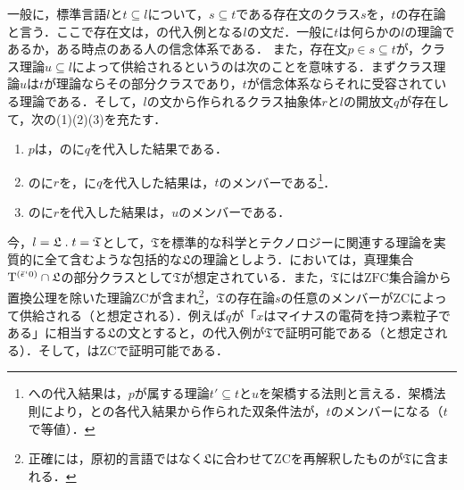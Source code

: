 一般に，標準言語$l$と$t\subseteq l$について，$s\subseteq t$である存在文のクラス$s$を，$t$の存在論と言う．ここで存在文は，の代入例となる$l$の文だ．一般に$t$は何らかの$l$の理論であるか，ある時点のある人の信念体系である．
また，存在文$p\in s\subseteq t$が，クラス理論$u\subseteq l$によって供給されるというのは次のことを意味する．まずクラス理論$u$は$t$が理論ならその部分クラスであり，$t$が信念体系ならそれに受容されている理論である．そして，$l$の文から作られるクラス抽象体$r$と$l$の開放文$q$が存在して，次の(1)(2)(3)を充たす．
\begin{enumerate}[label=(\arabic*)]
    \item $p$は，のに$q$を代入した結果である．
    \item {}の\kagi{$ \alpha $}に$r$を，に$q$を代入した結果は，$t$のメンバーである\footnote{
        への代入結果は，$p$が属する理論$t'\subseteq t$と$u$を架橋する法則と言える．架橋法則により，との各代入結果から作られた双条件法が，$t$のメンバーになる（$t$で等値）．
    }．
    \item {}の\kagi{$ \alpha $}に$r$を代入した結果は，$u$のメンバーである．
\end{enumerate}

今，$ l = \mathfrak{L}\con{1}t = \mathfrak{T} $として，$\mathfrak{T}$を標準的な科学とテクノロジーに関連する理論を実質的に全て含むような包括的な$\mathfrak{L}$の理論としよう．においては，真理集合$\mathrm{T}^{(\breve{\epsilon}{\mspace{1mu}{`}\mspace{1mu}} 0)}\cap\mathfrak{L}$の部分クラスとして$\mathfrak{T}$が想定されている．また，$\mathfrak{T}$には$\mathrm{ZFC}$集合論から置換公理を除いた理論ZCが含まれ\footnote{正確には，原初的言語ではなく$\mathfrak{L}$に合わせてZCを再解釈したものが$\mathfrak{T}$に含まれる．}，$\mathfrak{T}$の存在論$s$の任意のメンバーがZCによって供給される（と想定される）．例えば$q$が「$x$はマイナスの電荷を持つ素粒子である」に相当する$\mathfrak{L}$の文とすると，の代入例が$\mathfrak{T}$で証明可能である（と想定される）．そして，はZCで証明可能である．

